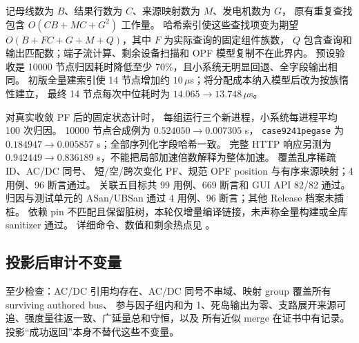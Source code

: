 记母线数为 $B$、结果行数为 $C$、来源映射数为 $M$、发电机数为 $G$，
原有重复查找包含 $O(CB+MC+G^2)$ 工作量。
哈希索引使这些查找项变为期望 $O(B+FC+G+M+Q)$，其中 $F$ 为实际查询的固定组件族数，
$Q$ 包含查询和输出匹配数；端子流计算、剩余设备扫描和 OPF 模型复制不在此界内。
预设验收是 10000 节点归因耗时降低至少 70\%，且小系统无明显回退、全字段输出相同。
初版全量建索引使 14 节点增加约 $10\,\mu$s；将分配成本纳入模型后改为按族惰性建立，
最终 14 节点每次中位耗时为 $14.065\to13.748\,\mu$s。

 对真实收敛 PF 后的固定状态计时，
每组运行三个新进程，小系统每进程平均 100 次归因。
10000 节点合成例为 $0.524050\to0.007305$ s，
\texttt{case9241pegase} 为 $0.184947\to0.005857$ s；全部序列化字段哈希一致。
完整 HTTP 响应另测为 $0.942449\to0.836189$ s，不能把局部加速倍数解释为整体加速。
 覆盖乱序稀疏 ID、AC/DC 同号、
短/空/跨次变化 PF、规范 OPF position 与有序来源映射；4 用例、96 断言通过。
关联五目标共 99 用例、669 断言和 GUI API 82/82 通过。
归因与测试单元的 ASan/UBSan 通过 4 用例、96 断言；其他 Release 档案未插桩。
依赖 pin 不匹配且保留脏树，本轮仅增量编译链接，未声称全量构建或全库 sanitizer 通过。
详细命令、数值和剩余热点见 。

\subsection{投影后审计不变量}

至少检查：AC/DC 引用均存在、AC/DC 同号不串域、映射 group 覆盖所有 surviving authored bus、
参与因子组内和为 1、死岛输出为零、支路展开来源可追、强度量往返一致、广延量总和守恒，以及
所有近似 merge 在证书中有记录。投影“成功返回”本身不替代这些不变量。
